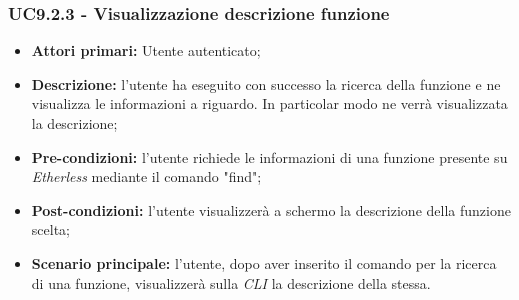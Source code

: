 \subsubsection{UC9.2.3 - Visualizzazione descrizione funzione}
\begin{itemize}
	\item \textbf{Attori primari:} Utente autenticato;
	\item \textbf{Descrizione:} l'utente ha eseguito con successo la ricerca della funzione e ne visualizza le informazioni a riguardo. In particolar modo ne verrà visualizzata la descrizione; 
	\item \textbf{Pre-condizioni:} l'utente richiede le informazioni di una funzione presente su \textit{Etherless} mediante il comando "find"; 
	\item \textbf{Post-condizioni:} l'utente visualizzerà a schermo la descrizione della funzione scelta;
	\item \textbf{Scenario principale:} l'utente, dopo aver inserito il comando per la ricerca di una funzione, visualizzerà sulla \textit{CLI\glo} la descrizione della stessa.
\end{itemize}